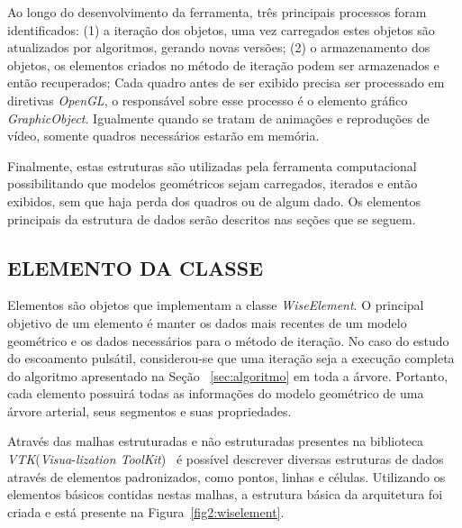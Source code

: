 Ao longo do desenvolvimento da ferramenta, três principais processos foram identificados: (1) a iteração dos objetos, uma vez carregados estes objetos são atualizados por algoritmos, gerando novas versões; (2) o armazenamento dos objetos, os elementos criados no método de iteração podem ser armazenados e então recuperados;   Cada quadro antes de ser exibido precisa ser processado em diretivas \textit{OpenGL}, o responsável sobre esse processo é o elemento gráfico \textit{GraphicObject}. Igualmente quando se tratam de animações e reproduções de vídeo, somente quadros necessários estarão em memória. 

Finalmente, estas estruturas são utilizadas pela ferramenta computacional possibilitando que modelos geométricos sejam carregados, iterados e então exibidos, sem que haja perda dos quadros ou de algum dado. Os elementos principais da estrutura de dados serão descritos nas seções que se seguem.

\subsection{ELEMENTO DA CLASSE}\label{sec:elemento_inteligente}

Elementos são objetos que implementam a classe \textit{WiseElement}. O principal objetivo de um elemento é manter os dados mais recentes de um modelo geométrico e os dados necessários para o método de iteração. No caso do estudo do escoamento pulsátil, considerou-se que uma iteração seja a execução completa do algoritmo apresentado na Seção~ \ref{sec:algoritmo} em toda a árvore. Portanto, cada elemento possuirá todas as informações do modelo geométrico de uma árvore arterial, seus segmentos e suas propriedades.

Através das malhas estruturadas e não estruturadas presentes na biblioteca \textit{VTK}(\textit{Visua}-\textit{lization ToolKit})~\cite{VTKUSER} é possível descrever diversas estruturas de dados através de elementos padronizados, como pontos, linhas e células. Utilizando os elementos básicos contidas nestas malhas, a estrutura básica da arquitetura foi criada e está presente na Figura~\ref{fig2:wiselement}.

